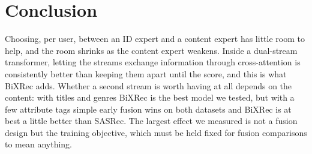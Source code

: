 \documentclass[conference]{IEEEtran}
\begin{document}
\section{Conclusion}
Choosing, per user, between an ID expert and a content expert has little room to help, and the room shrinks as the
content expert weakens. Inside a dual-stream transformer, letting the streams exchange information through
cross-attention is consistently better than keeping them apart until the score, and this is what BiXRec adds. Whether
a second stream is worth having at all depends on the content: with titles and genres BiXRec is the best model we
tested, but with a few attribute tags simple early fusion wins on both datasets and BiXRec is at best a little better
than SASRec. The largest effect we measured is not a fusion design but the training objective, which must be held
fixed for fusion comparisons to mean anything.



\end{document}
